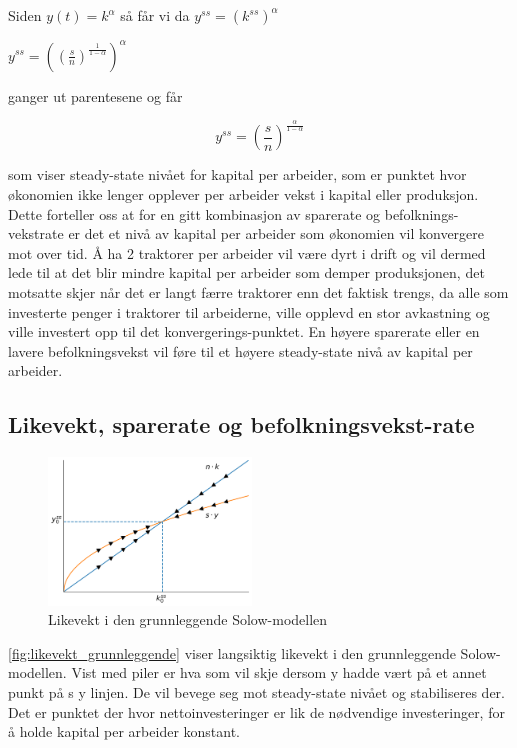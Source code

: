 \documentclass[
  12pt,
  a4paper,
  DIV=11,
  numbers=noendperiod]{scrartcl}
\begin{document}
Siden \(y(t)=k^\alpha\) så får vi da
\(y^{ss}=\left(k^{ss}\right)^\alpha\)

\(y^{ss}=\left(\left( \frac{s}{n}\right)^\frac{1}{1-\alpha}\right)^\alpha\)

ganger ut parentesene og får

\[y^{ss}=\left( \frac{s}{n}\right)^\frac{\alpha}{1-\alpha}\]

som viser steady-state nivået for kapital per arbeider, som er punktet
hvor økonomien ikke lenger opplever per arbeider vekst i kapital eller
produksjon. Dette forteller oss at for en gitt kombinasjon av sparerate
og befolknings-vekstrate er det et nivå av kapital per arbeider som
økonomien vil konvergere mot over tid. Å ha 2 traktorer per arbeider vil
være dyrt i drift og vil dermed lede til at det blir mindre kapital per
arbeider som demper produksjonen, det motsatte skjer når det er langt
færre traktorer enn det faktisk trengs, da alle som investerte penger i
traktorer til arbeiderne, ville opplevd en stor avkastning og ville
investert opp til det konvergerings-punktet. En høyere sparerate eller
en lavere befolkningsvekst vil føre til et høyere steady-state nivå av
kapital per arbeider.

\clearpage

\subsection{Likevekt, sparerate og
befolkningsvekst-rate}\label{likevekt-sparerate-og-befolkningsvekst-rate}

\begin{figure}
    \includegraphics[width=0.48\textwidth]{Likevekt_grunnleggende.png}
  \caption{Likevekt i den grunnleggende Solow-modellen}
  \label{fig:likevekt_grunnleggende}
  \vspace{-12mm}
\end{figure}

\autoref{fig:likevekt_grunnleggende} viser langsiktig likevekt i den
grunnleggende Solow-modellen. Vist med piler er hva som vil skje dersom
y hadde vært på et annet punkt på s \cdot y linjen. De vil bevege seg
mot steady-state nivået og stabiliseres der. Det er punktet der hvor
nettoinvesteringer er lik de nødvendige investeringer, for å holde
kapital per arbeider konstant.
\end{document}
